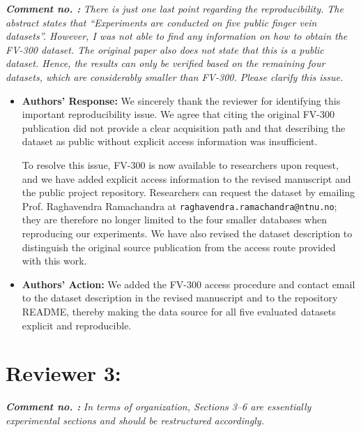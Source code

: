 \documentclass[11pt]{article}
\theoremstyle{remark}
\newcounter{mycounter} %
\newcommand\showReviewcounter{\stepcounter{mycounter}\themycounter}
\begin{document}
\textbf{\textit{Comment no. \showReviewcounter:}}
\textit{There is just one last point regarding the reproducibility. The abstract states that ``Experiments are conducted on five public finger vein datasets''. However, I was not able to find any information on how to obtain the FV-300 dataset. The original paper also does not state that this is a public dataset. Hence, the results can only be verified based on the remaining four datasets, which are considerably smaller than FV-300. Please clarify this issue.}
\color{black}

\begin{itemize}
    \item \textbf{Authors' Response:}
    We sincerely thank the reviewer for identifying this important reproducibility issue. We agree that citing the original FV-300 publication did not provide a clear acquisition path and that describing the dataset as public without explicit access information was insufficient.

    To resolve this issue, FV-300 is now available to researchers upon request, and we have added explicit access information to the revised manuscript and the public project repository. Researchers can request the dataset by emailing Prof. Raghavendra Ramachandra at \texttt{raghavendra.ramachandra@ntnu.no}; they are therefore no longer limited to the four smaller databases when reproducing our experiments. We have also revised the dataset description to distinguish the original source publication from the access route provided with this work.

    \item \textbf{Authors' Action:}
    We added the FV-300 access procedure and contact email to the dataset description in the revised manuscript and to the repository README, thereby making the data source for all five evaluated datasets explicit and reproducible.
\end{itemize}

\setcounter{mycounter}{0}
\color{blue}
\section*{Reviewer 3:}

\textbf{\textit{Comment no. \showReviewcounter:}}
\textit{In terms of organization, Sections 3--6 are essentially experimental sections and should be restructured accordingly.}
\color{black}
\end{document}
